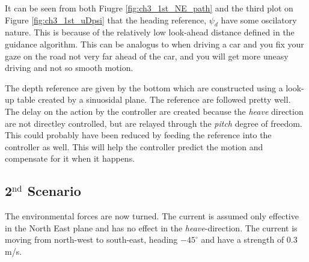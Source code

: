 		It can be seen from both Fiugre \ref{fig:ch3_1st_NE_path} and the
		third plot on Figure \ref{fig:ch3_1st_uDpsi} that the heading reference, $\psi_d$ have some
		oscilatory nature. This is because of the relatively low look-ahead distance defined in the
		guidance algorithm. This can be analogus to when driving a car and you fix your gaze on
		the road not very far ahead of the car, and you will get more uneasy driving and not so smooth motion. 

		The depth reference are given by the bottom which are constructed using a look-up table
		created by a sinuosidal plane. The reference are followed pretty well. The delay on the
		action by the controller are created because the \textit{heave} direction are not directley
		controlled, but are relayed through the \textit{pitch} degree of freedom. This could probably
		have been reduced by feeding the reference into the controller as well. This will help the
		controller predict the motion and compensate for it when it happens.

	
	\subsection{2$^{\mathrm{nd}}$ Scenario}
		The environmental forces are now turned. The current is assumed only effective in the North
		East plane and has no effect in the \textit{heave}-direction. The current is moving from
		north-west to south-east, heading $-45^{\circ}$ and have a strength of $0.3$ m/s. 
		
